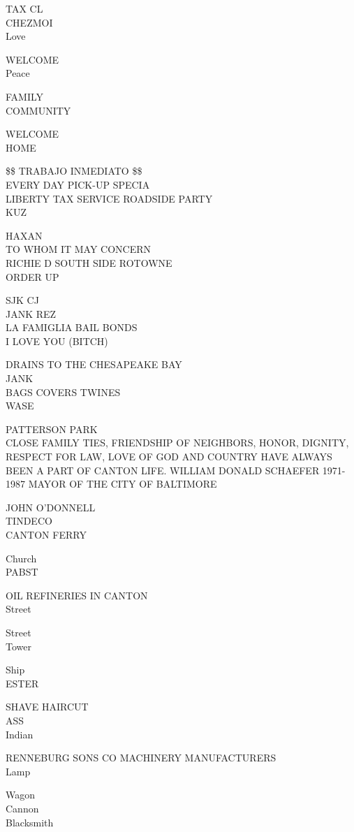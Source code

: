 \documentclass[10pt,letterpaper]{article}
\begin{document}
TAX CL\\
CHEZMOI\\
Love

WELCOME\\
Peace

FAMILY\\
COMMUNITY

WELCOME\\
HOME

\$\$ TRABAJO INMEDIATO \$\$\\
EVERY DAY PICK{-}UP SPECIA\\
LIBERTY TAX SERVICE ROADSIDE PARTY\\
KUZ

HAXAN\\
TO WHOM IT MAY CONCERN\\
RICHIE D SOUTH SIDE ROTOWNE\\
ORDER UP

SJK CJ\\
JANK REZ\\
LA FAMIGLIA BAIL BONDS\\
I LOVE YOU (BITCH)

DRAINS TO THE CHESAPEAKE BAY\\
JANK\\
BAGS COVERS TWINES\\
WASE

PATTERSON PARK\\
CLOSE FAMILY TIES, FRIENDSHIP OF NEIGHBORS, HONOR, DIGNITY, RESPECT FOR LAW, LOVE OF GOD AND COUNTRY HAVE ALWAYS BEEN A PART OF CANTON LIFE.  WILLIAM DONALD SCHAEFER 1971{-}1987 MAYOR OF THE CITY OF BALTIMORE

JOHN O'DONNELL\\
TINDECO\\
CANTON FERRY

Church\\
PABST

OIL REFINERIES IN CANTON\\
Street

Street\\
Tower

Ship\\
ESTER

SHAVE HAIRCUT\\
ASS\\
Indian

RENNEBURG SONS CO MACHINERY MANUFACTURERS\\
Lamp

Wagon\\
Cannon\\
Blacksmith
\end{document}
